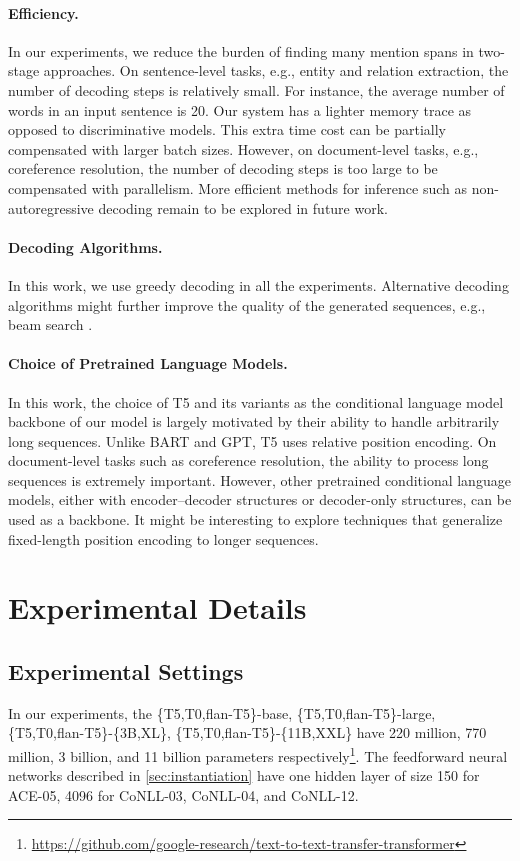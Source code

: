\documentclass[11pt]{article}
\begin{document}
\paragraph{Efficiency.}
In our experiments, we reduce the burden of finding many mention spans in two-stage approaches.  
On sentence-level tasks, e.g., entity and relation extraction, the number of decoding steps is relatively small. 
For instance, the average number of words in an input sentence is 20. Our system has a lighter memory trace as opposed to discriminative models. This extra time cost can be partially compensated with larger batch sizes.
However, on document-level tasks, e.g., coreference resolution, the number of decoding steps is too large to be compensated with parallelism. More efficient methods for inference such as non-autoregressive decoding \cite{gu2018nonautoregressive} remain to be explored in future work.

\paragraph{Decoding Algorithms.}
In this work, we use greedy decoding in all the experiments. 
Alternative decoding algorithms might further improve the quality of the generated sequences, e.g., beam search \cite{zhang-clark-2008-tale,goldberg-etal-2013-efficient}.


\paragraph{Choice of Pretrained Language Models.} 
In this work, the choice of T5 and its variants as the conditional language model backbone of our model is largely motivated by their ability to handle arbitrarily long sequences. Unlike BART and GPT, T5 uses relative position encoding. On document-level tasks such as coreference resolution, the ability to process long sequences is extremely important.
However, other pretrained conditional language models, either with encoder--decoder structures or decoder-only structures, can be used as a backbone. It might be interesting to explore techniques that generalize fixed-length position encoding to longer sequences.



\clearpage
\appendix

\section{Experimental Details}
\subsection{Experimental Settings} \label{appendix:exp_setting}
In our experiments, the \{T5,T0,flan-T5\}-base, \{T5,T0,flan-T5\}-large, \{T5,T0,flan-T5\}-\{3B,XL\}, \{T5,T0,flan-T5\}-\{11B,XXL\} have 220 million, 770 million, 3 billion, and 11 billion parameters respectively\footnote{\url{https://github.com/google-research/text-to-text-transfer-transformer}}. The feedforward neural networks described in \cref{sec:instantiation} have one hidden layer of size 150 for ACE-05, 4096 for CoNLL-03, CoNLL-04, and CoNLL-12.
\end{document}
